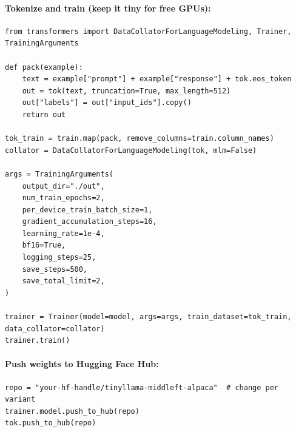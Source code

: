 \documentclass[11pt]{article}
\begin{document}
\paragraph{Tokenize and train (keep it tiny for free GPUs):}
\begin{lstlisting}[style=py]
from transformers import DataCollatorForLanguageModeling, Trainer, TrainingArguments

def pack(example):
    text = example["prompt"] + example["response"] + tok.eos_token
    out = tok(text, truncation=True, max_length=512)
    out["labels"] = out["input_ids"].copy()
    return out

tok_train = train.map(pack, remove_columns=train.column_names)
collator = DataCollatorForLanguageModeling(tok, mlm=False)

args = TrainingArguments(
    output_dir="./out",
    num_train_epochs=2,
    per_device_train_batch_size=1,
    gradient_accumulation_steps=16,
    learning_rate=1e-4,
    bf16=True,
    logging_steps=25,
    save_steps=500,
    save_total_limit=2,
)

trainer = Trainer(model=model, args=args, train_dataset=tok_train, data_collator=collator)
trainer.train()
\end{lstlisting}

\paragraph{Push weights to Hugging Face Hub:}
\begin{lstlisting}[style=py]
repo = "your-hf-handle/tinyllama-middleft-alpaca"  # change per variant
trainer.model.push_to_hub(repo)
tok.push_to_hub(repo)
\end{lstlisting}
\end{document}
